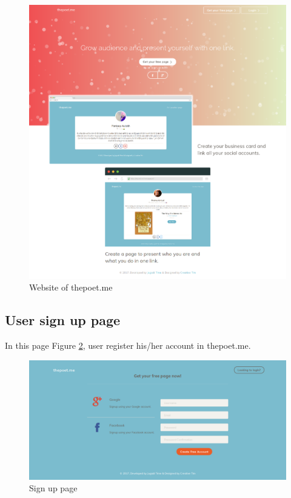 \begin{figure}
    \centering \includegraphics[scale=0.35]{images/app/poetwebsite-fullpage.png}
    \caption{Website of thepoet.me}
    \label{straightrebar}
\end{figure}

\subsection{User sign up page}
In this page Figure \ref{poet2}, user register his/her account in thepoet.me. 

\begin{figure}
    \centering \includegraphics[scale=0.35]{images/app/poetsignup-fullpage.png}
    \caption{Sign up page}
    \label{poet2}
\end{figure}

